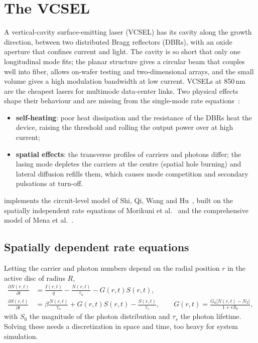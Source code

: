 \section{The VCSEL}\label{sec:vcsel}
A vertical-cavity surface-emitting laser (VCSEL) has its cavity along the growth direction,
between two distributed Bragg reflectors (DBRs), with an oxide aperture that confines current and
light. The cavity is so short that only one longitudinal mode fits; the planar structure gives a
circular beam that couples well into fiber, allows on-wafer testing and two-dimensional arrays,
and the small volume gives a high modulation bandwidth at low current. VCSELs at 850\,nm are the
cheapest lasers for multimode data-center links. Two physical effects shape their behaviour and
are missing from the single-mode rate equations~\cite{shi2009}:
\begin{itemize}
  \item \textbf{self-heating}: poor heat dissipation and the resistance of the DBRs heat the
  device, raising the threshold and rolling the output power over at high current;
  \item \textbf{spatial effects}: the transverse profiles of carriers and photons differ; the
  lasing mode depletes the carriers at the centre (spatial hole burning) and lateral diffusion
  refills them, which causes mode competition and secondary pulsations at turn-off.
\end{itemize}
 implements the circuit-level model of Shi, Qi, Wang and Hu~\cite{shi2009}, built on the
spatially independent rate equations of Morikuni et al.~\cite{morikuni1999} and the
comprehensive model of Mena et al.~\cite{mena1999}.

\subsection{Spatially dependent rate equations}
Letting the carrier and photon numbers depend on the radial position $r$ in the active disc of
radius $R$,
\begin{align}
  \frac{\partial N(r,t)}{\partial t}&=\frac{I(r,t)}{q}-\frac{N(r,t)}{\tau_n}-G(r,t)S(r,t),\\
  \frac{\partial S(r,t)}{\partial t}&=\beta\frac{N(r,t)}{\tau_n}+G(r,t)S(r,t)-\frac{S(r,t)}{\tau_s},\qquad
  G(r,t)=\frac{G_0\big[N(r,t)-N_T\big]}{1+\epsilon S_0},
\end{align}
with $S_0$ the magnitude of the photon distribution and $\tau_s$ the photon lifetime. Solving these
needs a discretization in space and time, too heavy for system simulation.

